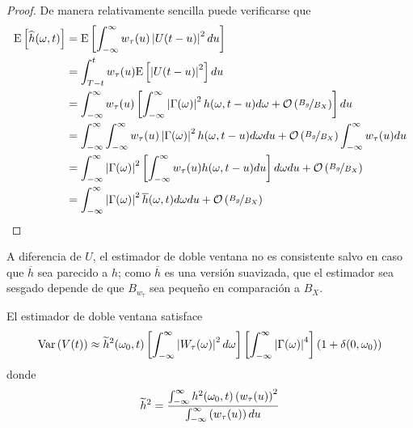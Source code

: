 \begin{proof}
De manera relativamente sencilla puede verificarse que
\begin{align*}
\mathrm{E}\left[ \widehat{h}(\omega,t) \right] &= 
\mathrm{E}\left[ \int_{-\infty}^{\infty} w_\tau (u) \left| U(t-u) \right|^{2} du \right] \\
&= 
\int_{T-t}^{t} w_\tau (u) \mathrm{E}\left[ \left| U(t-u) \right|^{2} \right] du \\
&=
\int_{-\infty}^{\infty} w_\tau (u) \left[
\int_{-\infty}^{\infty} \left| \Gamma(\omega) \right|^{2} h(\omega, t-u)d\omega + \mathcal{O}\left( \nicefrac{B_g}{B_X} \right) \right] du \\
&=
\int_{-\infty}^{\infty} \int_{-\infty}^{\infty} w_\tau (u) \left| \Gamma(\omega) \right|^{2} h(\omega, t-u)d\omega du +
\mathcal{O}\left( \nicefrac{B_g}{B_X} \right) \int_{-\infty}^{\infty} w_\tau (u) du \\
&=
\int_{-\infty}^{\infty} \left| \Gamma(\omega) \right|^{2} \left[ \int_{-\infty}^{\infty} w_\tau (u) h(\omega, t-u) du \right] d\omega du +
\mathcal{O}\left( \nicefrac{B_g}{B_X} \right) \\
&=
\int_{-\infty}^{\infty} \left| \Gamma(\omega) \right|^{2} \overline{h}(\omega,t) d\omega du +
\mathcal{O}\left( \nicefrac{B_g}{B_X} \right)
\end{align*}
\end{proof}

A diferencia de $U$, el estimador de doble ventana no es consistente salvo en caso que $\overline{h}$ sea parecido a $h$; como $\overline{h}$ es una versión suavizada, que el estimador sea sesgado depende de que $B_{w_\tau}$ sea pequeño en comparación a $B_X$.

\begin{proposicion}
El estimador de doble ventana satisface
\begin{equation}
\mathrm{Var}\left( V(t) \right) \approx \widetilde{h}^{2}(\omega_0,t) \left[ \int_{-\infty}^{\infty} \left| W_\tau(\omega) \right|^{2} d\omega \right] \left[ \int_{-\infty}^{\infty} \left| \Gamma(\omega) \right|^{4} \right] (1+\delta(0,\omega_0))
\end{equation}
donde
\begin{equation}
\widetilde{h}^{2} = \frac{\int_{-\infty}^{\infty} h^{2}(\omega_0,t) \left(w_\tau(u)\right)^{2}}{\int_{-\infty}^{\infty} \left(w_\tau(u)\right) du}
\end{equation}
\end{proposicion}

